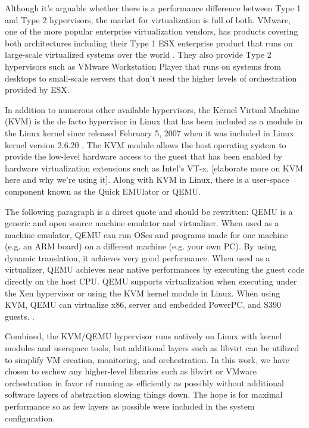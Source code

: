 Although it's arguable whether there is a performance difference between Type 1 and Type 2 hypervisors, the market for virtualization is full of both.  VMware, one of the more popular enterprise virtualization vendors, has products covering both architectures including their Type 1 ESX enterprise product that runs on large-scale virtualized systems over the world \autocite{_vmware_0}.  They also provide Type 2 hypervisors such as VMware Workstation Player that runs on systems from desktops to small-scale servers that don't need the higher levels of orchestration provided by ESX.  

In addition to numerous other available hypervisors, the Kernel Virtual Machine (KVM) is the de facto hypervisor in Linux that has been included as a module in the Linux kernel since released February 5, 2007 when it was included in Linux kernel version 2.6.20 \autocite{_kvm_1}.  The KVM module allows the host operating system to provide the low-level hardware access to the guest that has been enabled by hardware virtualization extensions such as Intel's VT-x.  [elaborate more on KVM here and why we're using it].  Along with KVM in Linux, there is a user-space component known as the Quick EMUlator or QEMU\autocite{_qemu_1}.  

The following paragraph is a direct quote and should be rewritten: QEMU is a generic and open source machine emulator and virtualizer.  When used as a machine emulator, QEMU can run OSes and programs made for one machine (e.g. an ARM board) on a different machine (e.g. your own PC). By using dynamic translation, it achieves very good performance.  When used as a virtualizer, QEMU achieves near native performances by executing the guest code directly on the host CPU. QEMU supports virtualization when executing under the Xen hypervisor or using the KVM kernel module in Linux. When using KVM, QEMU can virtualize x86, server and embedded PowerPC, and S390 guests. \autocite{_qemu_1}.  

Combined, the KVM/QEMU hypervisor runs natively on Linux with kernel modules and userspace tools, but additional layers such as libvirt \autocite{_libvirt_1} can be utilized to simplify VM creation, monitoring, and orchestration.  In this work, we have chosen to eschew any higher-level libraries such as libvirt or VMware orchestration in favor of running as efficiently as possibly without additional software layers of abstraction slowing things down.  The hope is for maximal performance so as few layers as possible were included in the system configuration.


